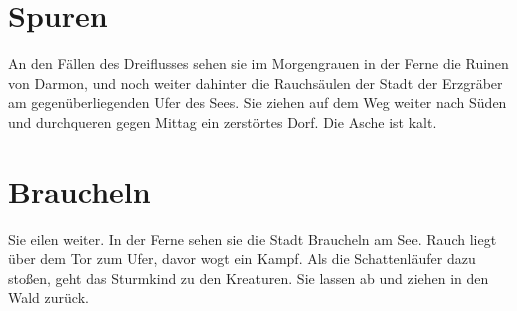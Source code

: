 \section{Spuren}
An den Fällen des Dreiflusses sehen sie im Morgengrauen in der Ferne die Ruinen von Darmon, und noch weiter dahinter die Rauchsäulen der Stadt der Erzgräber am gegenüberliegenden Ufer des Sees. Sie ziehen auf dem Weg weiter nach Süden und durchqueren gegen Mittag ein zerstörtes Dorf. Die Asche ist kalt.

\section{Braucheln}
Sie eilen weiter. In der Ferne sehen sie die Stadt Braucheln am See. Rauch liegt über dem Tor zum Ufer, davor wogt ein Kampf. Als die Schattenläufer dazu stoßen, geht das Sturmkind zu den Kreaturen. Sie lassen ab und ziehen in den Wald zurück.

